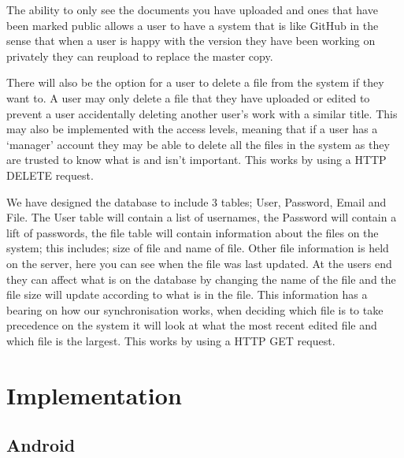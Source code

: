 \documentclass[11pt]{article}
\begin{document}
The ability to only see the documents you have uploaded and ones that have been marked public allows a user to have a system that is like GitHub in the sense that when a user is happy with the version they have been working on privately they can reupload to replace the master copy. 

There will also be the option for a user to delete a file from the system if they want to. A user may only delete a file that they have uploaded or edited to prevent a user accidentally deleting another user’s work with a similar title. This may also be implemented with the access levels, meaning that if a user has a ‘manager’ account they may be able to delete all the files in the system as they are trusted to know what is and isn’t important. This works by using a HTTP DELETE request.

We have designed the database to include 3 tables; User, Password, Email and File. The User table will contain a list of usernames, the Password will contain a lift of passwords, the file table will contain information about the files on the system; this includes; size of file and name of file. Other file information is held on the server, here you can see when the file was last updated. At the users end they can affect what is on the database by changing the name of the file and the file size will update according to what is in the file. This information has a bearing on how our synchronisation works, when deciding which file is to take precedence on the system it will look at what the most recent edited file and which file is the largest. This works by using a HTTP GET  request.



\section{Implementation}

\subsection{Android}
\end{document}
